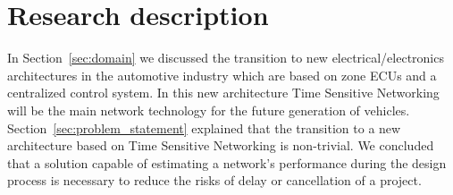 \section{Research description}
\label{sec:research_description}
In Section~\ref{sec:domain} we discussed the transition to new electrical/electronics architectures in the automotive industry which are based on zone ECUs and a centralized control system. In this new architecture Time Sensitive Networking will be the main network technology for the future generation of vehicles. Section~\ref{sec:problem_statement} explained that the transition to a new architecture based on Time Sensitive Networking is non-trivial. We concluded that a solution capable of estimating a network's performance during the design process is necessary to reduce the risks of delay or cancellation of a project.



